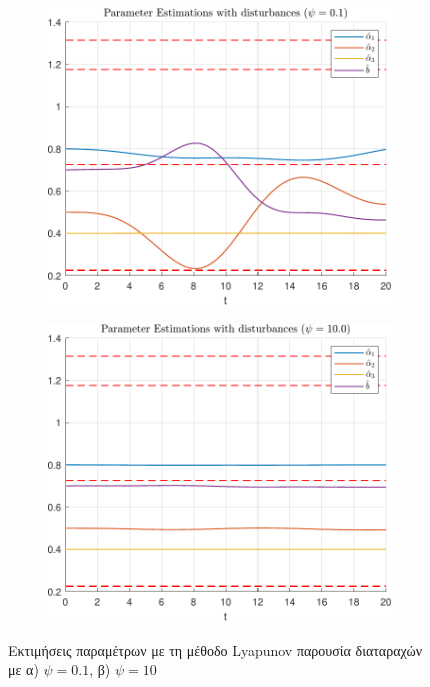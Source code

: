 \documentclass[a4paper,12pt]{article}
\begin{document}
\begin{figure}[h!]
    \centering
    \begin{subfigure}{0.45\textwidth}
        \centering
        \includegraphics[width=\linewidth]{
        plot/task2_parameter_estimations_disturbances_1.pdf}
        \caption{}
        \label{fig:task2_parameter_estimations_disturbances_1}
    \end{subfigure}
    \hfill
    \begin{subfigure}{0.45\textwidth}
        \centering
        \includegraphics[width=\linewidth]{
        plot/task2_parameter_estimations_disturbances_2.pdf}
        \caption{}
        \label{fig:task2_parameter_estimations_disturbances_2}
    \end{subfigure}
    \caption{Εκτιμήσεις παραμέτρων με τη μέθοδο Lyapunov
    παρουσία διαταραχών με α) $\psi = 0.1$, β) $\psi = 10$}
    \label{fig:task2_parameter_estimations_disturbances}
\end{figure}
\end{document}

